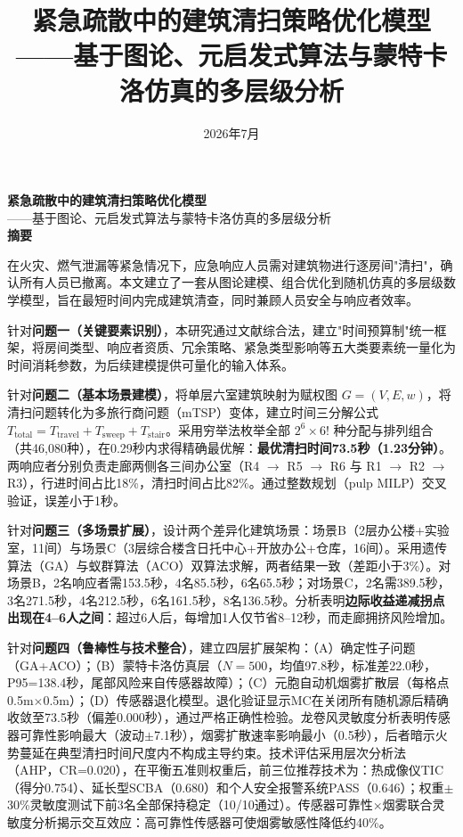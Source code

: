 \documentclass[12pt,a4paper]{ctexart}
\title{\textbf{\Large 紧急疏散中的建筑清扫策略优化模型}\\[6pt]
       \large ——基于图论、元启发式算法与蒙特卡洛仿真的多层级分析}
\author{}
\date{2026年7月}
\begin{document}
\begin{center}
    {\textbf{紧急疏散中的建筑清扫策略优化模型}}\\[4pt]
    {\large ——基于图论、元启发式算法与蒙特卡洛仿真的多层级分析}\\[8pt]
    {\textbf{摘\quad 要}}
\end{center}
\vspace{6pt}

在火灾、燃气泄漏等紧急情况下，应急响应人员需对建筑物进行逐房间"清扫"，确认所有人员已撤离。本文建立了一套从图论建模、组合优化到随机仿真的多层级数学模型，旨在最短时间内完成建筑清查，同时兼顾人员安全与响应者效率。

针对\textbf{问题一（关键要素识别）}，本研究通过文献综合法，建立"时间预算制"统一框架，将房间类型、响应者资质、冗余策略、紧急类型影响等五大类要素统一量化为时间消耗参数，为后续建模提供可量化的输入体系。

针对\textbf{问题二（基本场景建模）}，将单层六室建筑映射为赋权图 $G=(V,E,w)$，将清扫问题转化为多旅行商问题（mTSP）变体，建立时间三分解公式 $T_{\text{total}} = T_{\text{travel}} + T_{\text{sweep}} + T_{\text{stair}}$。采用穷举法枚举全部 $2^6\times 6!$ 种分配与排列组合（共46,080种），在0.29秒内求得精确最优解：\textbf{最优清扫时间73.5秒（1.23分钟）}。两响应者分别负责走廊两侧各三间办公室（R4 $\rightarrow$ R5 $\rightarrow$ R6 与 R1 $\rightarrow$ R2 $\rightarrow$ R3），行进时间占比18\%，清扫时间占比82\%。通过整数规划（pulp MILP）交叉验证，误差小于1秒。

针对\textbf{问题三（多场景扩展）}，设计两个差异化建筑场景：场景B（2层办公楼+实验室，11间）与场景C（3层综合楼含日托中心+开放办公+仓库，16间）。采用遗传算法（GA）与蚁群算法（ACO）双算法求解，两者结果一致（差距小于3\%）。对场景B，2名响应者需153.5秒，4名85.5秒，6名65.5秒；对场景C，2名需389.5秒，3名271.5秒，4名212.5秒，6名161.5秒，8名136.5秒。分析表明\textbf{边际收益递减拐点出现在4--6人之间}：超过6人后，每增加1人仅节省8--12秒，而走廊拥挤风险增加。

针对\textbf{问题四（鲁棒性与技术整合）}，建立四层扩展架构：（A）确定性子问题（GA+ACO）；（B）蒙特卡洛仿真层（$N=500$，均值97.8秒，标准差22.0秒，P95=138.4秒，尾部风险来自传感器故障）；（C）元胞自动机烟雾扩散层（每格点0.5m$\times$0.5m）；（D）传感器退化模型。退化验证显示MC在关闭所有随机源后精确收敛至73.5秒（偏差0.000秒），通过严格正确性检验。龙卷风灵敏度分析表明传感器可靠性影响最大（波动$\pm$7.1秒），烟雾扩散速率影响最小（0.5秒），后者暗示火势蔓延在典型清扫时间尺度内不构成主导约束。技术评估采用层次分析法（AHP，CR=0.020），在平衡五准则权重后，前三位推荐技术为：热成像仪TIC（得分0.754）、延长型SCBA（0.680）和个人安全报警系统PASS（0.646）；权重$\pm$30\%灵敏度测试下前3名全部保持稳定（10/10通过）。传感器可靠性$\times$烟雾联合灵敏度分析揭示交互效应：高可靠性传感器可使烟雾敏感性降低约40\%。
\end{document}
